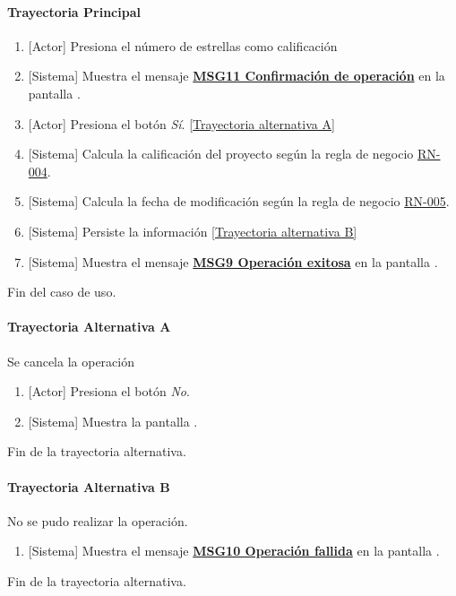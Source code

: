 \paragraph{Trayectoria Principal}
	\begin{enumerate}
	    \item {[Actor]} Presiona el número de estrellas como calificación
	    \item {[Sistema]} Muestra el mensaje \hyperref[MSG11]{\bf MSG11 Confirmación de operación} en la pantalla \textbf{}.
	    \item {[Actor]} Presiona el botón \textit{Sí}. \hyperref[W-PR-CU1.1.6.1:TA]{[Trayectoria alternativa A]}
	    \item {[Sistema]} Calcula la calificación del proyecto según la regla de negocio \hyperref[RN004]{RN-004}.
	    \item {[Sistema]} Calcula la fecha de modificación según la regla de negocio \hyperref[RN005]{RN-005}.
	    \item {[Sistema]} Persiste la información  \hyperref[W-PR-CU1.1.6.1:TA]{[Trayectoria alternativa B]}
	    \item {[Sistema]} Muestra el mensaje \hyperref[MSG9]{\bf MSG9 Operación exitosa} en la pantalla \textbf{}.
	\end{enumerate}
	Fin del caso de uso.

\paragraph{Trayectoria Alternativa A} \label{W-PR-CU1.1.6.1:TA}
    Se cancela la operación
	\begin{enumerate}[label=A\arabic*.]
	    \item {[Actor]} Presiona el botón \textit{No}.
		\item {[Sistema]} Muestra la pantalla \textbf{}.
	\end{enumerate}
	Fin de la trayectoria alternativa.

\paragraph{Trayectoria Alternativa B} \label{W-PR-CU1.1.6.1:TB}
    No se pudo realizar la operación.
	\begin{enumerate}[label=A\arabic*.]
		\item {[Sistema]} Muestra el mensaje \hyperref[MSG10]{\bf MSG10 Operación fallida}  en la pantalla \textbf{}.
	\end{enumerate}
	Fin de la trayectoria alternativa.
